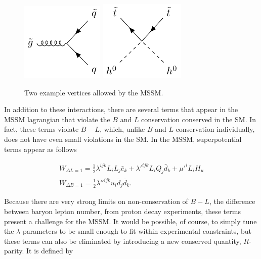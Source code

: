 \begin{centering}
\begin{figure}[!hbt]
\myfloatalign
\includegraphics[width=.45\linewidth]{feynman/gluino.pdf}
\includegraphics[width=.45\linewidth]{feynman/higgs_stop.pdf}
\caption{Two example vertices allowed by the \ac{MSSM}.}
\label{fig:mssm_int}
\end{figure}
\end{centering}

In addition to these interactions, there are several terms that appear in the \ac{MSSM} lagrangian that violate the $B$ and $L$ conservation conserved in the \ac{SM}. In fact, these terms violate $B-L$, which, unlike $B$ and $L$ conservation individually, does not have even small violations in the \ac{SM}. In the \ac{MSSM}, superpotential terms appear as follows

\begin{eqnarray}
W_{\Delta L = 1} = \frac{1}{2}\lambda^{ijk}L_i L_j \bar{e}_k + \lambda'^{ijk}L_i Q_j \bar{d}_k + \mu'^i L_i H_u \\
W_{\Delta B = 1} = \frac{1}{2}\lambda''^{ijk}\bar{u}_i \bar{d}_j \bar{d}_k .
\label{eq:rviol}
\end{eqnarray}

Because there are very strong limits on non-conservation of $B-L$, the difference between baryon lepton number, from proton decay experiments, these terms present a challenge for the \ac{MSSM}. It would be possible, of course, to simply tune the $\lambda$ parameters to be small enough to fit within experimental constraints, but these terms can also be eliminated by introducing a new conserved quantity, $R$-parity. It is defined by

